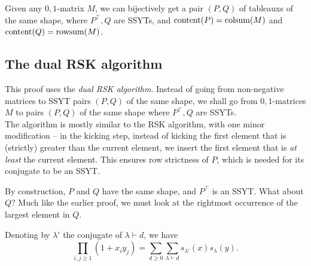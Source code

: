 	\begin{ftheo}
		Given any $0,1$-matrix $M$, we can bijectively get a pair $(P,Q)$ of tableauxs of the same shape, where $P^\top, Q$ are SSYTs, and $\operatorname{content}(P) = \operatorname{colsum}(M)$ and $\operatorname{content}(Q) = \operatorname{rowsum}(M)$.  
	\end{ftheo}

\subsection{The dual RSK algorithm}

	This proof uses the \emph{dual RSK algorithm}. Instead of going from non-negative matrices to SSYT pairs $(P,Q)$ of the same shape, we shall go from $0,1$-matrices $M$ to pairs $(P,Q)$ of the same shape where $P^\top,Q$ are SSYTs.\\
	The algorithm is mostly similar to the RSK algorithm, with one minor modification -- in the kicking step, instead of kicking the first element that is (strictly) greater than the current element, we insert the first element that is \emph{at least} the current element. This ensures row strictness of $P$, which is needed for its conjugate to be an SSYT.









	By construction, $P$ and $Q$ have the same shape, and $P^\top$ is an SSYT. What about $Q$? Much like the earlier proof, we must look at the rightmost occurrence of the largest element in $Q$.


	\begin{fcor}
		Denoting by $\lambda'$ the conjugate of $\lambda \vdash d$, we have
		\[ \prod_{i,j \ge 1} (1+x_iy_j) = \sum_{d \ge 0} \sum_{\lambda \vdash d} s_{\lambda'}(x) s_\lambda(y). \]
	\end{fcor}


